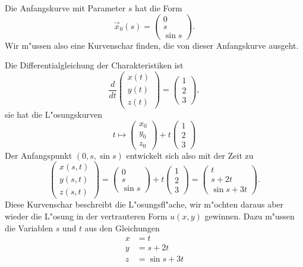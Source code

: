 Die Anfangskurve mit Parameter $s$ hat die Form
\[
\vec x_0(s)
=
\begin{pmatrix}
0\\s\\\sin s
\end{pmatrix}.
\]
Wir m"ussen also eine Kurvenschar finden, die von dieser Anfangskurve
ausgeht.

Die Differentialgleichung der Charakteristiken ist
\[
\frac{d}{dt}\begin{pmatrix}x(t)\\y(t)\\z(t)\end{pmatrix}
=
\begin{pmatrix}1\\2\\3\end{pmatrix},
\]
sie hat die L"osungskurven
\[
t\mapsto\begin{pmatrix}x_0\\y_0\\z_0\end{pmatrix}+t\begin{pmatrix}1\\2\\3\end{pmatrix}
\]
Der Anfangspunkt $(0,s,\sin s)$ entwickelt sich also mit der Zeit zu
\[
\begin{pmatrix}
x(s,t)\\
y(s,t)\\
z(s,t)
\end{pmatrix}
=
\begin{pmatrix}0\\s\\\sin s\end{pmatrix}+t\begin{pmatrix}1\\2\\3\end{pmatrix}
=
\begin{pmatrix}
t\\
s+2t\\
\sin s+3t
\end{pmatrix}.
\]
Diese Kurvenschar beschreibt die L"osungsfl"ache, wir m"ochten daraus aber
wieder die L"osung in der vertrauteren Form $u(x,y)$ gewinnen.
Dazu m"ussen die Variablen $s$ und $t$ aus den Gleichungen
\begin{align*}
x&=t\\
y&=s+2t\\
z&=\sin s+3t
\end{align*}

